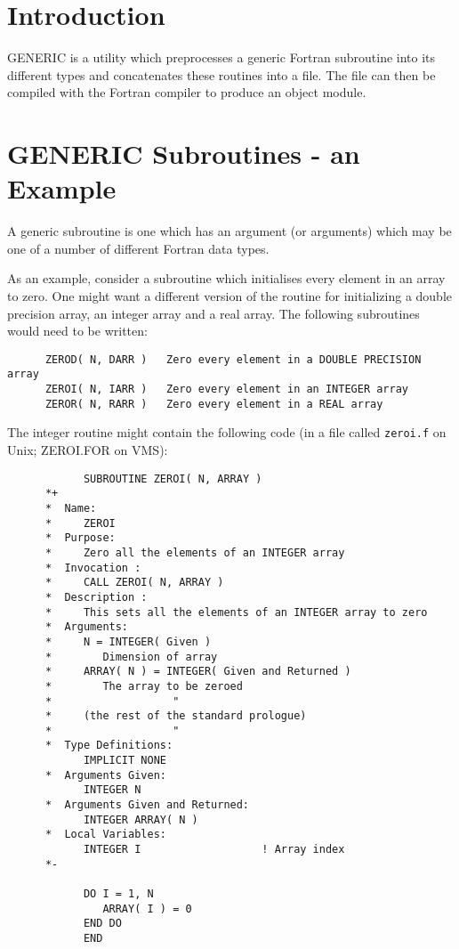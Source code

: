 \newpage
\section{Introduction}

GENERIC is a utility which preprocesses a generic Fortran subroutine into
its different types and concatenates these routines into a file.
The file can then be compiled with the Fortran compiler to produce an
object module.

\section{GENERIC Subroutines - an Example}

A generic subroutine is one which has an argument (or arguments)
which may be one of a number of different Fortran data types.

As an example, consider a subroutine which initialises every
element in an array to zero. 
One might want a different version of the routine for initializing
a double precision array, an integer array and a real array.
The following subroutines would need to be written:

\begin{verbatim}
      ZEROD( N, DARR )   Zero every element in a DOUBLE PRECISION array
      ZEROI( N, IARR )   Zero every element in an INTEGER array
      ZEROR( N, RARR )   Zero every element in a REAL array
\end{verbatim}

The integer routine might contain the following code (in a file
called {\tt zeroi.f} on Unix; ZEROI.FOR on VMS):

\begin{verbatim}
            SUBROUTINE ZEROI( N, ARRAY )
      *+
      *  Name:
      *     ZEROI
      *  Purpose:
      *     Zero all the elements of an INTEGER array
      *  Invocation :
      *     CALL ZEROI( N, ARRAY )
      *  Description :
      *     This sets all the elements of an INTEGER array to zero
      *  Arguments:
      *     N = INTEGER( Given )
      *        Dimension of array
      *     ARRAY( N ) = INTEGER( Given and Returned )
      *        The array to be zeroed
      *                   "
      *     (the rest of the standard prologue)
      *                   "
      *  Type Definitions:
            IMPLICIT NONE
      *  Arguments Given:
            INTEGER N
      *  Arguments Given and Returned:
            INTEGER ARRAY( N )
      *  Local Variables:
            INTEGER I                   ! Array index
      *-
      
            DO I = 1, N      
               ARRAY( I ) = 0
            END DO
            END
\end{verbatim}

